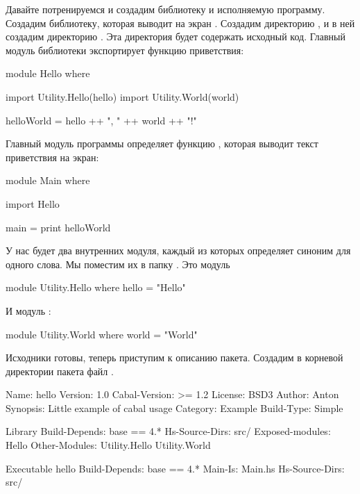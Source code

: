Давайте потренируемся и создадим библиотеку и 
исполняемую программу. Создадим библиотеку, которая 
выводит на экран .
Создадим директорию , и в ней создадим директорию
. Эта директория будет содержать исходный код. 
Главный модуль библиотеки экспортирует функцию приветствия:

\begin{code}
module Hello where

import Utility.Hello(hello)
import Utility.World(world)

helloWorld = hello ++ ", " ++ world ++ "!"
\end{code}

Главный модуль программы  определяет функцию
, которая выводит текст приветствия на экран:

\begin{code}
module Main where

import Hello 

main = print helloWorld
\end{code}



У нас будет два внутренних модуля, каждый из которых
определяет синоним для одного слова. Мы поместим их
в папку  . Это модуль 

\begin{code}
module Utility.Hello where
hello = "Hello"
\end{code}

И модуль :

\begin{code}
module Utility.World where
world = "World"
\end{code}

Исходники готовы, теперь приступим к описанию пакета.
Создадим в корневой директории пакета файл . 

\begin{code}
Name:           hello
Version:        1.0
Cabal-Version:  >= 1.2
License:        BSD3
Author:         Anton
Synopsis:       Little example of cabal usage
Category:       Example
Build-Type:     Simple

Library
  Build-Depends: base == 4.*
  Hs-Source-Dirs: src/
  Exposed-modules:
    Hello
  Other-Modules:
    Utility.Hello
    Utility.World

Executable hello
  Build-Depends: base == 4.*
  Main-Is: Main.hs
  Hs-Source-Dirs: src/
\end{code}


